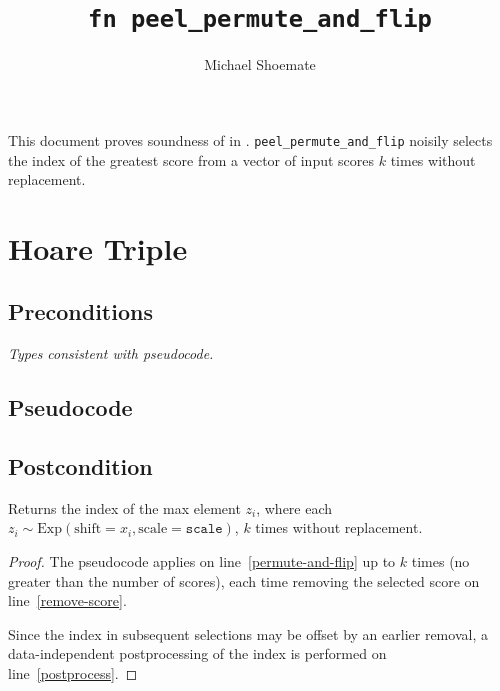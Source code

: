 \documentclass{article}
\title{\texttt{fn peel\_permute\_and\_flip}}
\author{Michael Shoemate}
\begin{document}
\maketitle\contrib
This document proves soundness of  in . 
\texttt{peel\_permute\_and\_flip} noisily selects the index of the greatest score from a vector of input scores $k$ times without replacement.

\section{Hoare Triple}
\subsection*{Preconditions}
\textit{Types consistent with pseudocode.}

\subsection*{Pseudocode}
\label{sec:python-pseudocode}


\subsection*{Postcondition}
\begin{theorem}
    \label{postcondition}
    Returns the index of the max element $z_i$,
    where each $z_i \sim \mathrm{Exp}(\mathrm{shift}=x_i, \mathrm{scale}=\texttt{scale})$, $k$ times without replacement.
\end{theorem}

\begin{proof}
    The pseudocode applies  on line~\ref{permute-and-flip}
    up to $k$ times (no greater than the number of scores),
    each time removing the selected score on line~\ref{remove-score}.

    Since the index in subsequent selections may be offset by an earlier removal,
    a data-independent postprocessing of the index is performed on line~\ref{postprocess}.
\end{proof}
\end{document}
